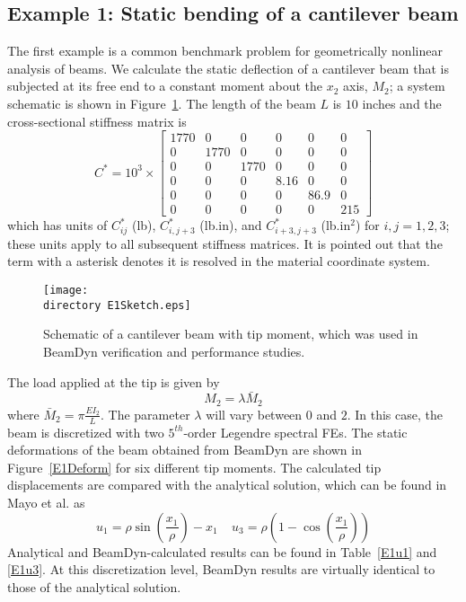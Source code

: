\subsection{Example 1: Static bending of a cantilever beam}

The first example is a common benchmark problem for geometrically nonlinear
analysis of beams\cite{Simo1985,Xiao-Zhong:2012}. We calculate the static
deflection of a cantilever beam that is subjected at its free end to
a constant moment about the $x_2$ axis, $M_2$; a system schematic is shown in Figure~\ref{E1Sketch}.  The length of the beam $L$ is $10$ inches and the cross-sectional stiffness 
matrix is 
\begin{equation}
    \label{StifE1}
    C^* = 10^3 \times \begin{bmatrix}
	1770 & 0    & 0    & 0    & 0    & 0   \\
	 0    & 1770 & 0    & 0    & 0    & 0   \\
	 0   &   0   & 1770 & 0    & 0    & 0   \\
	 0   &   0   &  0    & 8.16 & 0    & 0   \\
	 0   &   0   &  0    &  0    & 86.9 & 0   \\
	 0   &   0   &  0    &  0    &   0   & 215
\end{bmatrix}
\end{equation}
which has units of $C_{ij}^*$ (lb), $C_{i,j+3}^*$ (lb.in), and
$C_{i+3,j+3}^*$ (lb.in$^2$) for $i,j = 1,2,3$; these units apply to all
subsequent stiffness matrices. It is pointed out that the term with a
asterisk denotes it is resolved in the material coordinate system. 

\begin{figure}
    \centering \texttt{[image: \\directory
E1Sketch.eps]} \caption{Schematic of a cantilever beam with tip moment,
which was used in BeamDyn verification and performance studies.}
    \label{E1Sketch}
\end{figure} 

The load applied at the tip is given by 
\begin{equation}
    \label{E1Load}
    M_2 = \lambda \bar{M}_2
\end{equation}
where $\bar{M}_2 = \pi \frac{EI_2}{L}$. The parameter $\lambda$ will vary between $0$ and $2$. In 
this case, the beam is discretized with two $5^{th}$-order Legendre
spectral FEs. The
static deformations of the beam obtained from BeamDyn are shown in
Figure~\ref{E1Deform} for six different tip moments.
The calculated tip displacements are compared with the analytical solution,
which can be found in Mayo et al.\cite{Mayo-etal:2004} as
\begin{equation}
    \label{E1Analytical}
    u_1 = \rho \sin \left( \frac{x_1}{\rho} \right) - x_1~~~~~u_3 = \rho
\left(1-\cos\left(\frac{x_1}{\rho}\right) \right)
\end{equation}
Analytical and BeamDyn-calculated results can be found in Table~\ref{E1u1}
and \ref{E1u3}. At this discretization level, BeamDyn results are virtually
identical to those of the analytical solution.

